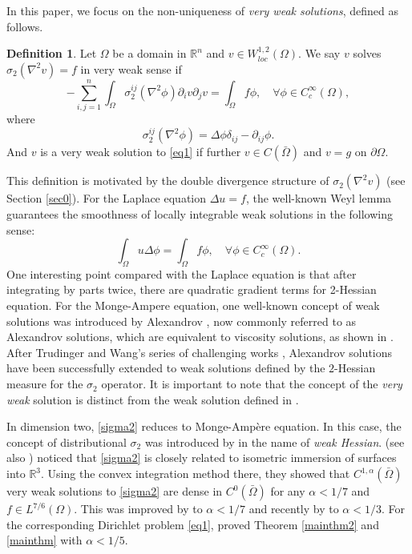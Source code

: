 \documentclass[reqno,12pt]{amsart}
\numberwithin{equation}{section}
\theoremstyle{plain}
\theoremstyle{definition}
\newtheorem{defn}[thm]{Definition}
\newcommand{\R}{\mathbb{R}}
\begin{document}
In this paper, we focus on the non-uniqueness of \emph{very weak solutions}, defined as follows.
\begin{defn}\label{def1}
Let $\Omega$ be a domain in $\R^n$ and $v\in W^{1,2}_{loc}(\Omega)$. We say $v$ solves $\sigma_2(\nabla^2v)=f$ in very weak sense if
\begin{equation*}
-\sum^n_{i,j=1}\int_\Omega \sigma_2^{ij}(\nabla^2\phi)\partial_i v\partial_j v = \int_\Omega f\phi,\quad\forall \phi\in C^\infty_c(\Omega),
\end{equation*}
where
\begin{equation*}
\sigma_2^{ij}(\nabla^2\phi)=\Delta\phi\delta_{ij}-\partial_{ij}\phi.    
\end{equation*}
And $v$ is a very weak solution to \eqref{eq1} if further $v\in C(\bar\Omega)$ and $v=g$ on $\partial\Omega$.
\end{defn}
This definition is motivated by the double divergence structure of $\sigma_2(\nabla^2v)$ (see Section \ref{sec0}). For the Laplace equation $\Delta u=f$, the well-known Weyl lemma guarantees the smoothness of locally integrable weak solutions in the following sense:
\begin{equation*}
\int_\Omega u \Delta \phi = \int_\Omega f \phi, \quad \forall \phi \in C^\infty_c(\Omega).
\end{equation*}
 One interesting point compared with the Laplace equation is that after integrating by parts twice, there are quadratic gradient terms for 2-Hessian equation. For the Monge-Ampere equation, one well-known concept of weak solutions was introduced by Alexandrov \cite{Aleksandrov58}, now commonly referred to as Alexandrov solutions, which are equivalent to viscosity solutions, as shown in \cite{Gutirrez16}.  After Trudinger and Wang's series of challenging works \cite{Trudinger-Wang1, Trudinger-Wang2, Trudinger-Wang3}, Alexandrov solutions have been successfully extended to weak solutions defined by the $2$-Hessian measure for the $\sigma_2$ operator. It is important to note that the concept of the  \emph{very weak} solution is distinct from the weak solution defined in \cite{Trudinger-Wang1,Trudinger-Wang2,Trudinger-Wang3}.
 

In dimension two, \eqref{sigma2} reduces to Monge-Amp\`ere equation. In this case, the concept of distributional $\sigma_2$ was introduced by \citet{iwaniec01concept} in the name of \emph{weak Hessian}. \citet{lewicka17convex} (see also \cite{jean22revisiting,codenotii2019visualization}) noticed that \eqref{sigma2} is closely related to isometric immersion of surfaces into $\R^3$. Using the convex integration method there, they showed that $C^{1,\alpha}(\bar\Omega)$ very weak solutions to \eqref{sigma2} are dense in $C^0(\bar\Omega)$ for any $\alpha<1/7$ and $f\in L^{7/6}(\Omega)$. This was improved by \citet{cao19very} to $\alpha<1/7$ and recently by \citet*{cao23c1frac13} to $\alpha<1/3$. For the corresponding Dirichlet problem \eqref{eq1}, \citet{cao23dirichlet} proved Theorem \ref{mainthm2} and \ref{mainthm} with $\alpha<1/5$.
 
\end{document}
